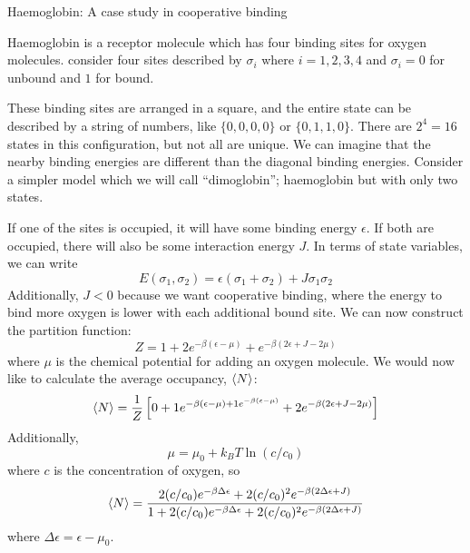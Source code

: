\documentclass[a4paper,twoside,master.tex]{subfiles}
\begin{document}
\begin{ex}
    Haemoglobin: A case study in cooperative binding

    Haemoglobin is a receptor molecule which has four binding sites for oxygen molecules. consider four sites described by $ \sigma_i $ where $ i = 1,2,3,4 $ and $ \sigma_i = 0 $ for unbound and $ 1 $ for bound.
    
    These binding sites are arranged in a square, and the entire state can be described by a string of numbers, like $ \{0,0,0,0\} $ or $ \{0,1,1,0\} $. There are $ 2^4 = 16 $ states in this configuration, but not all are unique. We can imagine that the nearby binding energies are different than the diagonal binding energies. Consider a simpler model which we will call ``dimoglobin''; haemoglobin but with only two states.

    If one of the sites is occupied, it will have some binding energy $ \epsilon $. If both are occupied, there will also be some interaction energy $ J $. In terms of state variables, we can write
    \begin{equation}
        E(\sigma_1, \sigma_2) = \epsilon(\sigma_1 + \sigma_2) + J \sigma_1 \sigma_2
    \end{equation}
    Additionally, $ J < 0 $ because we want cooperative binding, where the energy to bind more oxygen is lower with each additional bound site. We can now construct the partition function:
    \begin{equation}
        Z = 1 + 2e^{- \beta (\epsilon - \mu)} + e^{- \beta (2 \epsilon + J - 2 \mu)}
    \end{equation}
    where $ \mu $ is the chemical potential for adding an oxygen molecule. We would now like to calculate the average occupancy, $ \ev{N} $:
    \begin{equation}
        \ev{N} = \frac{1}{Z} \left[ 0 + 1 e^{- \beta (\epsilon - \mu) + 1 e^{- \beta (\epsilon - \mu)}} + 2 e^{- \beta (2 \epsilon + J - 2 \mu)} \right]
    \end{equation}
    Additionally,
    \begin{equation}
        \mu = \mu_0 + k_B T \ln(c/c_0)
    \end{equation}
    where $ c $ is the concentration of oxygen, so
    \begin{equation}
        \ev{N} = \frac{2(c/c_0)e^{- \beta \Delta \epsilon} + 2(c/c_0)^2 e^{- \beta (2 \Delta \epsilon + J)}}{1 + 2(c/c_0)e^{- \beta \Delta \epsilon} + 2(c/c_0)^2 e^{- \beta (2 \Delta \epsilon + J)}}
    \end{equation}
    where $ \Delta \epsilon = \epsilon - \mu_0 $.



\end{ex}
\end{document}

